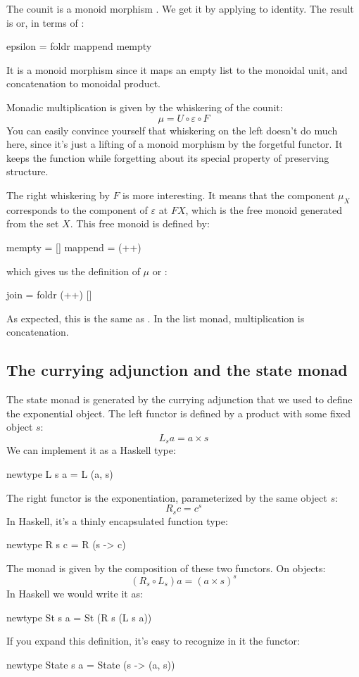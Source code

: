 \documentclass[DaoFP]{subfiles}
\begin{document}
The counit is a monoid morphism . We get it by applying  to identity. The result is  or, in terms of :
\begin{haskell}
epsilon = foldr mappend mempty
\end{haskell}
It is a monoid morphism since it maps an empty list to the monoidal unit, and concatenation to monoidal product.

Monadic multiplication is given by the whiskering of the counit:
\[ \mu = U \circ \varepsilon \circ F \]
You can easily convince yourself that whiskering on the left doesn't do much here, since it's just a lifting of a monoid morphism by the forgetful functor. It keeps the function while forgetting about its special property of preserving structure. 

The right whiskering by $F$ is more interesting. It means that the component $\mu_X$ corresponds to the component of $\varepsilon$ at $F X$, which is the free monoid generated from the set $X$. This  free monoid is defined by:
\begin{haskell}
mempty = []
mappend = (++)
\end{haskell}
which gives us the definition of $\mu$ or :
\begin{haskell}
join = foldr (++) []
\end{haskell}
As expected, this is the same as . In the list monad, multiplication is concatenation.

\subsection{The currying adjunction and the state monad}

The state monad is generated by the currying adjunction that we used to define the exponential object. The left functor is defined by a product with some fixed object $s$:
\[ L_s a = a \times s \]
We can implement it as a Haskell type:
\begin{haskell}
newtype L s a = L (a, s)
\end{haskell}
The right functor is the exponentiation, parameterized by the same object $s$:
\[ R_s c = c^s \]
In Haskell, it's a thinly encapsulated function type:
\begin{haskell}
newtype R s c = R (s -> c)
\end{haskell}

The monad is given by the composition of these two functors. On objects:
\[(R_s \circ L_s) a = (a \times s)^s \]
In Haskell we would write it as:
\begin{haskell}
newtype St s a = St (R s (L s a))
\end{haskell}
If you expand this definition, it's easy to recognize in it the  functor:
\begin{haskell}
newtype State s a = State (s -> (a, s))
\end{haskell}
\end{document}
